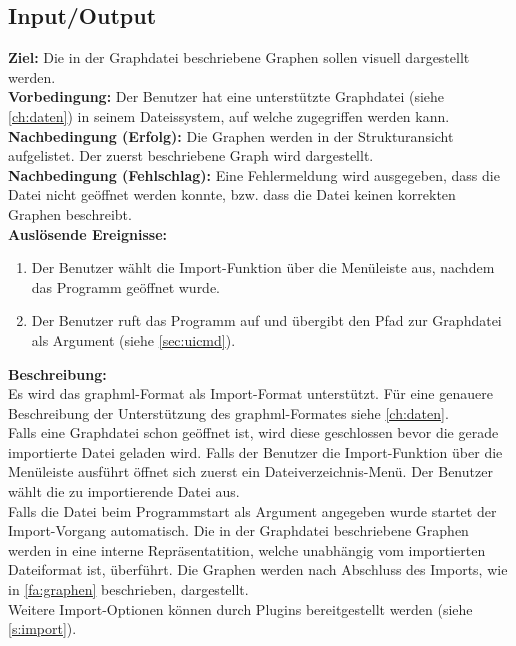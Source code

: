 \subsection{Input/Output}
\setcounter{fanr}{100}

\label{fa:import}
\textbf{Ziel:} Die in der Graphdatei beschriebene Graphen sollen visuell dargestellt werden.\\
\textbf{Vorbedingung:} Der Benutzer hat eine unterstützte Graphdatei (siehe \ref{ch:daten}) in seinem Dateissystem, auf welche zugegriffen werden kann.\\
\textbf{Nachbedingung (Erfolg):} Die Graphen werden in der Strukturansicht aufgelistet. Der zuerst beschriebene Graph wird dargestellt.\\
\textbf{Nachbedingung (Fehlschlag):}
Eine Fehlermeldung wird ausgegeben, dass die Datei nicht geöffnet werden konnte, bzw. dass die Datei keinen korrekten Graphen beschreibt.\\
\textbf{Auslösende Ereignisse:}
\begin{enumerate}[nolistsep, label=(\alph*)]
  \item Der Benutzer wählt die Import-Funktion über die Menüleiste aus, nachdem das Programm geöffnet wurde. %
  \item Der Benutzer ruft das Programm auf und übergibt den Pfad zur Graphdatei als Argument (siehe \ref{sec:uicmd}).
\end{enumerate}
\textbf{Beschreibung:}\\
Es wird das \gls{graphml}-Format als Import-Format unterstützt. Für eine genauere Beschreibung der Unterstützung des \gls{graphml}-Formates siehe \ref{ch:daten}.\\
Falls eine Graphdatei schon geöffnet ist, wird diese geschlossen bevor die gerade importierte Datei geladen wird.
Falls der Benutzer die Import-Funktion über die Menüleiste ausführt öffnet sich zuerst ein Dateiverzeichnis-Menü.
Der Benutzer wählt die zu importierende Datei aus.\\
Falls die Datei beim Programmstart als Argument angegeben wurde startet der Import-Vorgang automatisch.
Die in der Graphdatei beschriebene Graphen werden in eine interne Repräsentatition, welche unabhängig vom importierten Dateiformat ist, überführt.%
Die Graphen werden nach Abschluss des Imports, wie in \ref{fa:graphen} beschrieben, dargestellt.\\
Weitere Import-Optionen können durch Plugins bereitgestellt werden (siehe \ref{s:import}).

